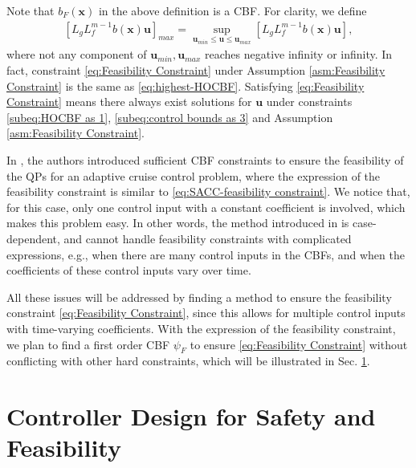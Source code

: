 \documentclass[letterpaper, 10 pt, conference]{ieeeconf}
\theoremstyle{definition}
\begin{document}
Note that $b_{F}(\boldsymbol{x})$ in the above definition is a CBF. For clarity, we define
\begin{equation}
\label{eq:Maximum value}
\begin{split}
[L_{g}L_{f}^{m-1}b(\boldsymbol{x})\boldsymbol{u}]_{max}=\sup_{\boldsymbol{u}_{min}\le \boldsymbol{u} \le \boldsymbol{u}_{max}}[L_{g}L_{f}^{m-1}b(\boldsymbol{x})\boldsymbol{u}],
\end{split}
\end{equation}
where not any component of $\boldsymbol{u}_{min},\boldsymbol{u}_{max}$ reaches negative infinity or infinity. In fact, constraint \eqref{eq:Feasibility Constraint}   under Assumption \ref{asm:Feasibility Constraint} is the same as \eqref{eq:highest-HOCBF}. Satisfying \eqref{eq:Feasibility Constraint} means there always exist solutions for $\boldsymbol{u}$ under constraints \eqref{subeq:HOCBF as 1}, \eqref{subeq:control bounds as 3} and Assumption \ref{asm:Feasibility Constraint}.

In \cite{xiao2022sufficient}, the authors introduced sufficient CBF constraints to ensure the feasibility of the QPs for an adaptive cruise control problem, where the expression of the feasibility constraint is similar to \eqref{eq:SACC-feasibility constraint}. We notice that, for this case, only one control input with a constant coefficient is involved, which makes this problem easy. In other words, the method introduced in \cite{xiao2022sufficient} is case-dependent, and cannot handle feasibility constraints with complicated expressions, e.g., when there are many control inputs in the CBFs, and when the coefficients of these control inputs vary over time. 

All these issues will be addressed by finding a method to ensure the feasibility constraint \eqref{eq:Feasibility Constraint}, since this allows for multiple control inputs with time-varying coefficients. With the expression of the feasibility constraint, we plan to find a first order CBF $\psi_{F}$ to ensure \eqref{eq:Feasibility Constraint} without conflicting with other hard constraints, which will be illustrated in Sec. \ref{sec:Controller Design for Safety and Feasibility}.

\section{Controller Design for Safety and Feasibility} 
\label{sec:Controller Design for Safety and Feasibility}
\end{document}
